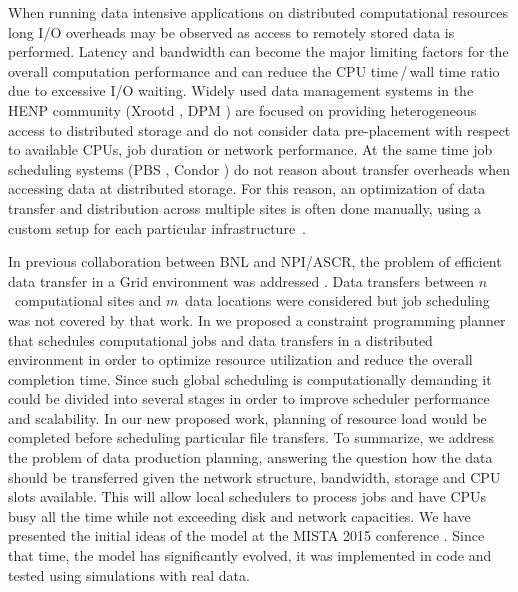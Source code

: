 \documentclass{svjour3}                     %
\begin{document}
When running data intensive applications on distributed computational
resources long I/O overheads may be observed as access to remotely stored data
is performed. Latency and bandwidth can become the major limiting factors for
the overall computation performance and can reduce the CPU time\,/\,wall time 
ratio due to excessive I/O waiting. 
Widely used data management systems in the HENP community
(Xrootd \cite{Xrootd}, DPM \cite{DPM}) are focused on providing heterogeneous access to distributed
storage and do not consider data pre-placement with respect to available CPUs,
job duration or network performance. At the same time job scheduling systems
(PBS \cite{PBS}, Condor \cite{Torque}) do not reason about transfer overheads when accessing data at
distributed storage. For this reason, an optimization of data transfer and
distribution across multiple sites is often done manually, using a custom
setup for each particular infrastructure~\cite{Balewski}. 

In previous collaboration between BNL and NPI/ASCR, the problem of
efficient data transfer in a Grid environment was addressed \cite{Zerola}.
Data transfers between $n$~computational sites and $m$~data locations were
considered but job scheduling was not covered
by that work. In \cite{ACAT_cp} we
proposed a constraint programming planner that schedules computational jobs
and data transfers in a distributed environment in order to optimize resource
utilization and reduce the overall completion time. Since such global
scheduling is computationally demanding it could be divided into several
stages in order to improve scheduler performance and scalability. In our new proposed work, planning of resource load would be completed before scheduling particular file transfers. To summarize, we address the problem of data production
planning, answering the question how the data should be transferred given the
network structure, bandwidth, storage and CPU slots available. This will allow
local schedulers to process jobs and have CPUs busy all the time while not
exceeding disk and network capacities. 
We have presented the initial ideas of the model at the MISTA 2015 conference \cite{MISTA}. Since that time, the model has significantly evolved, it was implemented in code and tested using simulations with real data. 
\end{document}
